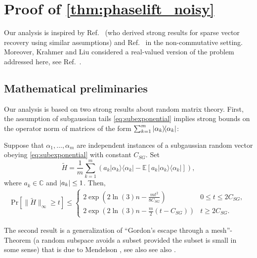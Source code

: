 \section{Proof of \cref{thm:phaselift_noisy}}
\label{sec:main_proof}

Our analysis is inspired by Ref.~\cite{Dirksen_2017_On} (who derived strong results for sparse vector recovery using similar assumptions) and Ref.~\cite{Kabanava_2015_Stable} in the non-commutative setting. Moreover, Krahmer and Liu considered a real-valued version of the problem addressed here, see Ref.~\cite{Krahmer_2016_Phase}.




\subsection{Mathematical preliminaries}

Our analysis is based on two strong results about random matrix theory. First, the assumption of subgaussian tails \eqref{eq:subexponential} implies strong bounds on the operator norm of matrices of the form $\sum_{k=1}^m \ket{{\alpha_k}}\bra{\alpha_k}$:

\begin{theorem} \label{thm:bernstein}
Suppose that $\alpha_1,\ldots,\alpha_m$ are independent instances of a subgaussian random vector obeying \eqref{eq:subexponential} with constant $C_{SG}$.
Set
\[
  \tilde{H} = \frac{1}{m} \sum_{k=1}^m \left( a_k |\alpha_k \rangle \! \langle \alpha_k| - \mathbb{E} \left[ a_k |\alpha_k \rangle \! \langle \alpha_k| \right] \right),
  \label{eq:Htilde}
\]
where $a_k \in \mathbb{C}$ and ${\vert a_k\vert} \leq 1$.
Then,
\begin{align*}
\mathrm{Pr} \left[ \| \tilde{H} \|_\infty \geq t \right]
\leq
\begin{cases}
2 \exp \left( 2 \ln (3) n  - \frac{mt^2}{8 C_{SG}} \right) & 0 \leq t \leq 2C_{SG}, \\
2 \exp \left( 2 \ln (3) n - \frac{m}{2} (t- C_{SG} )  \right) & t \geq 2 C_{SG}.
\end{cases}
\end{align*}
\end{theorem}


The second result is a generalization of ``Gordon's escape through a mesh''-Theorem \cite{Gordon_1988_On} (a random subspace avoids a subset provided the subset is small in some sense) that is due to Mendelson \cite{Mendelson_2015_Learning,Koltchinskii_2015_Bounding}, see also see also \cite{Tropp_2014_Convex}.

